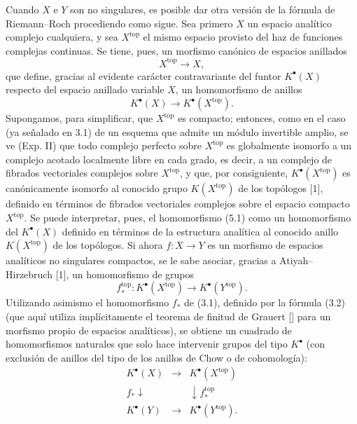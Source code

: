 Cuando $X$ e $Y$ son no singulares, es posible dar otra versión de la fórmula
de Riemann--Roch procediendo como sigue. Sea primero $X$ un espacio analítico
complejo cualquiera, y sea $X^{\mathrm{top}}$ el mismo espacio provisto del
haz de funciones complejas continuas. Se tiene, pues, un morfismo canónico de
espacios anillados
\[
X^{\mathrm{top}}\longrightarrow X,
\]
que define, gracias al evidente carácter contravariante del funtor
$K^\bullet(X)$ respecto del espacio anillado variable $X$, un homomorfismo
de anillos
\begin{equation}\tag{5.1}
K^\bullet(X)\longrightarrow K^\bullet(X^{\mathrm{top}}).
\end{equation}
Supongamos, para simplificar, que $X^{\mathrm{top}}$ es compacto; entonces,
como en el caso (ya señalado en 3.1) de un esquema que admite un módulo
invertible amplio, se ve (Exp. II) que todo complejo perfecto sobre
$X^{\mathrm{top}}$ es globalmente isomorfo a un complejo acotado localmente
libre en cada grado, es decir, a un complejo de fibrados vectoriales
complejos sobre $X^{\mathrm{top}}$, y que, por consiguiente,
$K^\bullet(X^{\mathrm{top}})$ es canónicamente isomorfo al conocido grupo
$K(X^{\mathrm{top}})$ de los topólogos [1], definido en términos de fibrados
vectoriales complejos sobre el espacio compacto $X^{\mathrm{top}}$. Se puede
interpretar, pues, el homomorfismo (5.1) como un homomorfismo del
$K^\bullet(X)$ definido en términos de la estructura analítica al conocido
anillo $K(X^{\mathrm{top}})$ de los topólogos. Si ahora
$f:X\longrightarrow Y$ es un morfismo de espacios analíticos no singulares
compactos, se le sabe asociar, gracias a Atiyah--Hirzebruch [1], un
homomorfismo de grupos
\begin{equation}\tag{5.2}
f^{\mathrm{top}}_*:K^\bullet(X^{\mathrm{top}})\longrightarrow K^\bullet(Y^{\mathrm{top}}).
\end{equation}
Utilizando asimismo el homomorfismo $f_*$ de (3.1), definido por la fórmula
(3.2) (que aquí utiliza implícitamente el teorema de finitud de Grauert [] %
para un morfismo propio de espacios analíticos), se obtiene un cuadrado de
homomorfismos naturales que solo hace intervenir grupos del tipo $K^\bullet$
(con exclusión de anillos del tipo de los anillos de Chow o de cohomología):
\begin{equation}\tag{5.3}
\begin{array}{ccc}
K^\bullet(X) & \longrightarrow & K^\bullet(X^{\mathrm{top}}) \\
f_*\downarrow && \downarrow f^{\mathrm{top}}_* \\
K^\bullet(Y) & \longrightarrow & K^\bullet(Y^{\mathrm{top}}).
\end{array}
\end{equation}
